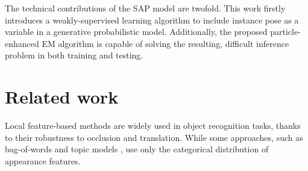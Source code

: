 The technical contributions of the SAP model are twofold. 
This work firstly introduces a weakly-supervised learning algorithm to include instance pose as a variable in a generative probabilistic model. Additionally, the proposed particle-enhanced EM algorithm is capable of solving the resulting, difficult inference problem in both training and testing.  






\section{Related work}
\label{sec/reg/relatedwork}

Local feature-based methods are widely used in object recognition tasks, thanks to their robustness to occlusion and translation. While some approaches, such as bag-of-words \cite{Sivic2005, Fei-Fei2005} and topic models \cite{Fergus2005}, use only the categorical distribution of appearance features. 

